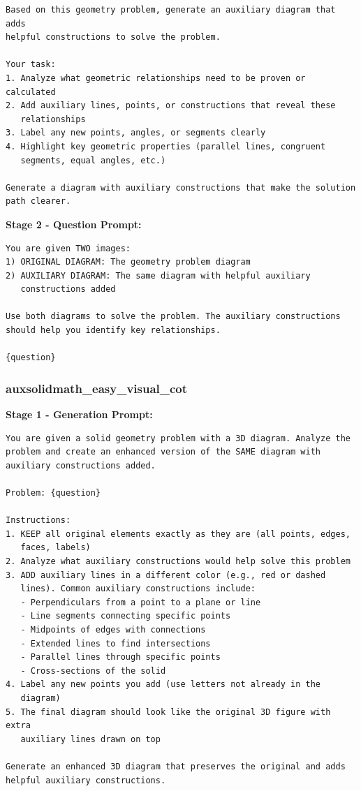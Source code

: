 \documentclass{article}
\theoremstyle{plain}
\theoremstyle{definition}
\theoremstyle{remark}
\begin{document}
\begin{verbatim}
Based on this geometry problem, generate an auxiliary diagram that adds
helpful constructions to solve the problem.

Your task:
1. Analyze what geometric relationships need to be proven or calculated
2. Add auxiliary lines, points, or constructions that reveal these
   relationships
3. Label any new points, angles, or segments clearly
4. Highlight key geometric properties (parallel lines, congruent
   segments, equal angles, etc.)

Generate a diagram with auxiliary constructions that make the solution
path clearer.
\end{verbatim}

\textbf{Stage 2 - Question Prompt:}

\begin{verbatim}
You are given TWO images:
1) ORIGINAL DIAGRAM: The geometry problem diagram
2) AUXILIARY DIAGRAM: The same diagram with helpful auxiliary
   constructions added

Use both diagrams to solve the problem. The auxiliary constructions
should help you identify key relationships.

{question}
\end{verbatim}

\subsubsection{auxsolidmath\_easy\_visual\_cot}

\textbf{Stage 1 - Generation Prompt:}

\begin{verbatim}
You are given a solid geometry problem with a 3D diagram. Analyze the
problem and create an enhanced version of the SAME diagram with
auxiliary constructions added.

Problem: {question}

Instructions:
1. KEEP all original elements exactly as they are (all points, edges,
   faces, labels)
2. Analyze what auxiliary constructions would help solve this problem
3. ADD auxiliary lines in a different color (e.g., red or dashed
   lines). Common auxiliary constructions include:
   - Perpendiculars from a point to a plane or line
   - Line segments connecting specific points
   - Midpoints of edges with connections
   - Extended lines to find intersections
   - Parallel lines through specific points
   - Cross-sections of the solid
4. Label any new points you add (use letters not already in the
   diagram)
5. The final diagram should look like the original 3D figure with extra
   auxiliary lines drawn on top

Generate an enhanced 3D diagram that preserves the original and adds
helpful auxiliary constructions.
\end{verbatim}
\end{document}
